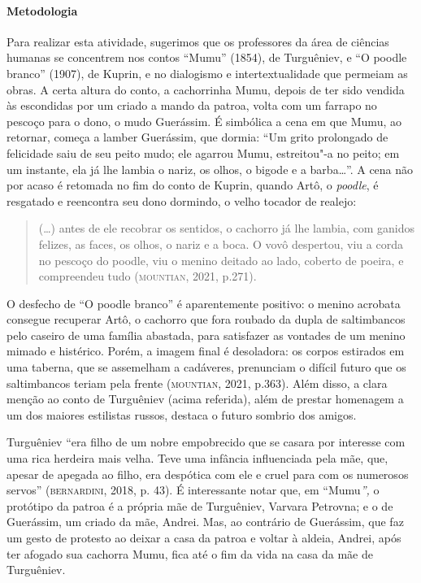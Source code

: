 \documentclass[11pt]{extarticle}
\begin{document}
\paragraph{Metodologia}
Para realizar esta atividade, sugerimos que os professores da área de ciências humanas se concentrem nos
contos ``Mumu'' (1854), de Turguêniev, e ``O poodle branco''
(1907), de Kuprin, e no dialogismo e intertextualidade que permeiam as
obras. A certa altura do conto, a cachorrinha Mumu, depois de ter sido
vendida às escondidas por um criado a mando da patroa, volta com um farrapo no pescoço para o
dono, o mudo Guerássim. É simbólica a cena em
que Mumu, ao retornar, começa a lamber Guerássim, que dormia: ``Um grito
prolongado de felicidade saiu de seu peito mudo; ele agarrou Mumu,
estreitou"-a no peito; em um instante, ela já lhe lambia o nariz, os
olhos, o bigode e a barba\ldots{}''. A cena não por acaso é retomada no fim
do conto de Kuprin, quando Artô, o \emph{poodle}, é resgatado e
reencontra seu dono dormindo, o velho tocador de realejo:

\begin{quote}
(\ldots{}) antes de ele recobrar os sentidos, o cachorro já lhe lambia, com
ganidos felizes, as faces, os olhos, o nariz e a boca. O vovô despertou,
viu a corda no pescoço do poodle, viu o menino deitado ao lado, coberto
de poeira, e compreendeu tudo (\textsc{mountian}, 2021, p.271).
\end{quote}

O desfecho de ``O poodle branco'' é aparentemente positivo: o menino
acrobata consegue recuperar Artô, o cachorro que fora roubado da dupla
de saltimbancos pelo caseiro de uma família abastada, para satisfazer as
vontades de um menino mimado e histérico. Porém, a imagem final é
desoladora: os corpos estirados em uma taberna, que se assemelham a
cadáveres, prenunciam o difícil futuro que os saltimbancos teriam pela
frente (\textsc{mountian}, 2021, p.363). Além disso, a clara menção ao conto de
Turguêniev (acima referida), além de prestar homenagem a um dos maiores
estilistas russos, destaca o futuro sombrio dos amigos.


Turguêniev ``era filho de um nobre empobrecido que se casara por
interesse com uma rica herdeira mais velha. Teve uma infância
influenciada pela mãe, que, apesar de apegada ao filho, era despótica
com ele e cruel para com os numerosos servos'' (\textsc{bernardini}, 2018, p.
43). É interessante notar que, em ``Mumu\emph{'',} o protótipo da patroa
é a própria mãe de Turguêniev, Varvara Petrovna; e o de Guerássim, um
criado da mãe, Andrei. Mas, ao contrário de Guerássim, que faz um gesto
de protesto ao deixar a casa da patroa e voltar à aldeia, Andrei, após
ter afogado sua cachorra Mumu, fica até o fim da vida na casa da mãe de
Turguêniev.
\end{document}
